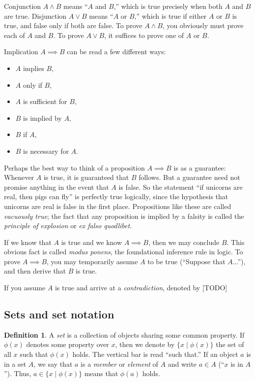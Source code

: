 \documentclass[11pt]{article}
\theoremstyle{definition}
\newtheorem{definition}[thm]{Definition}
\theoremstyle{remark}
\begin{document}
Conjunction $A \wedge B$ means ``$A$ and $B$,'' which is true precisely when both $A$ and $B$ are true. Disjunction $A \vee B$ means ``$A$ or $B$,'' which is true if either $A$ or $B$ is true, and false only if both are false. To prove $A \wedge B$, you obviously must prove each of $A$ and $B$. To prove $A \vee B$, it suffices to prove one of $A$ or $B$.

Implication $A \implies B$ can be read a few different ways:
\begin{itemize}
    \item $A$ implies $B$,
    \item $A$ only if $B$,
    \item $A$ is sufficient for $B$,
    \item $B$ is implied by $A$,
    \item $B$ if $A$,
    \item $B$ is necessary for $A$.
\end{itemize}
Perhaps the best way to think of a proposition $A \implies B$ is as a guarantee: Whenever $A$ is true, it is guaranteed that $B$ follows. But a guarantee need not promise anything in the event that $A$ is false. So the statement ``if unicorns are real, then pigs can fly'' is perfectly true logically, since the hypothesis that unicorns are real is false in the first place. Propositions like these are called \emph{vacuously true}; the fact that any proposition is implied by a falsity is called the \emph{principle of explosion} or \emph{ex falso quodlibet}.

If we know that $A$ is true and we know $A \implies B$, then we may conclude $B$. This obvious fact is called \emph{modus ponens}, the foundational inference rule in logic. To prove $A \implies B$, you may temporarily assume $A$ to be true (``Suppose that $A$...''), and then derive that $B$ is true.

If you assume $A$ is true and arrive at a \emph{contradiction}, denoted by [TODO]

\subsection{Sets and set notation}

\begin{definition}
    A \emph{set} is a collection of objects sharing some common property. If $\phi(x)$ denotes some property over $x$, then we denote by $\{x \mid \phi(x)\}$ the set of all $x$ such that $\phi(x)$ holds. The vertical bar is read ``such that.'' If an object $a$ is in a set $A$, we say that $a$ is a \emph{member} or \emph{element} of $A$ and write $a \in A$ (``$x$ is in $A$''). Thus, $a \in \{x \mid \phi(x)\}$ means that $\phi(a)$ holds.
\end{definition}
\end{document}
